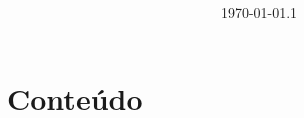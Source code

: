 \documentclass[12pt]{article}
\title{\bfseries\color{DarkGreen!75!}%
	\mytitle%
}
\author{\myauthor}
\date{\today.1}
\begin{document}


\maketitle



\renewcommand{\contentsname}{} %

\section*{Conteúdo}
\begin{multicols}{2} \tableofcontents \end{multicols}


\restoregeometry
\end{document}
